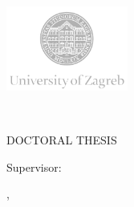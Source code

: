 \makeatletter
\begin{titlepage}
   \begin{Center}

       \includegraphics[width=0.30\textwidth]{figures/logo/uni_zg_logo_en.png}
       
       \vspace{-0.2cm}
       
       {\fontsize{16pt}{19.2pt}\selectfont\@ENfaculty\\
                                          \@ENdepartment\par}

       \vspace{2.5cm}
       
       {\fontsize{16pt}{19.2pt}\selectfont\@author}
       
       \vspace{3.0cm}
       
       {\fontsize{22pt}{26.4pt}\selectfont\textbf{\@title}\par}
       
       \vspace{2.0cm}

       {\fontsize{16pt}{19.2pt}\selectfont DOCTORAL THESIS}
       
       \vspace{2.0cm}
       
       {\fontsize{16pt}{19.2pt}\selectfont Supervisor:\\
                                           \@ENsupervisor\par}

       \vfill
       
       {\fontsize{14pt}{16.8pt}\selectfont\@place, \@date}
            
   \end{Center}
\end{titlepage}
\makeatother

{\let\cleardoublepage\relax \frontmatter}

